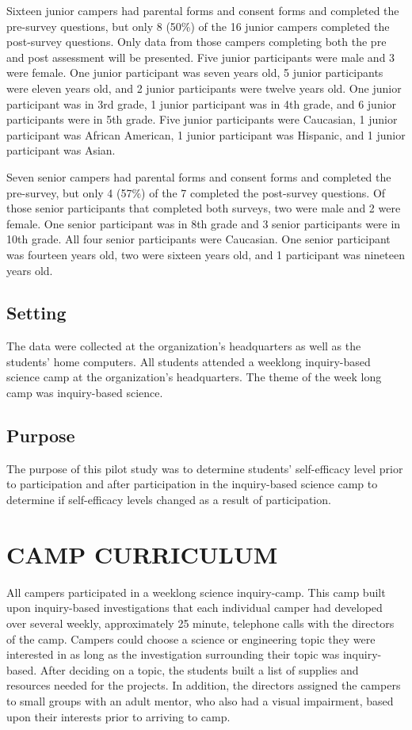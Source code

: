 \documentclass[11.5pt]{sig-alternate} %
\begin{document}
\begin{large}
Sixteen junior campers had parental forms and consent forms and completed the pre-survey questions, but only 8 (50\%) of the 16 junior campers completed the post-survey questions. Only data from those campers completing both the pre and post assessment will be presented. Five junior participants were male and 3 were female. One junior participant was seven years old, 5 junior participants were eleven years old, and 2 junior participants were twelve years old. One junior participant was in 3rd grade, 1 junior participant was in 4th grade, and 6 junior participants were in 5th grade. Five junior participants were Caucasian, 1 junior participant was African American, 1 junior participant was Hispanic, and 1 junior participant was Asian.   

Seven senior campers had parental forms and consent forms and completed the pre-survey, but only 4 (57\%) of the 7 completed the post-survey questions. Of those senior participants that completed both surveys, two were male and 2 were female. One senior participant was in 8th grade and 3 senior participants were in 10th grade. All four senior participants were Caucasian. One senior participant was fourteen years old, two were sixteen years old, and 1 participant was nineteen years old.   

\subsection*{Setting}

The data were collected at the organization’s headquarters as well as the students’ home computers. All students attended a weeklong inquiry-based science camp at the organization’s headquarters. The theme of the week long camp was inquiry-based science.

\subsection*{Purpose}

The purpose of this pilot study was to determine students’ self-efficacy level prior to participation and after participation in the inquiry-based science camp to determine if self-efficacy levels changed as a result of participation.  

\section*{CAMP CURRICULUM}

All campers participated in a weeklong science inquiry-camp.  This camp built upon inquiry-based investigations that each individual camper had developed over several weekly, approximately 25 minute, telephone calls with the directors of the camp. Campers could choose a science or engineering topic they were interested in as long as the investigation surrounding their topic was inquiry-based. After deciding on a topic, the students built a list of supplies and resources needed for the projects. In addition, the directors assigned the campers to small groups with an adult mentor, who also had a visual impairment, based upon their interests prior to arriving to camp.


\end{large}
\end{document}
